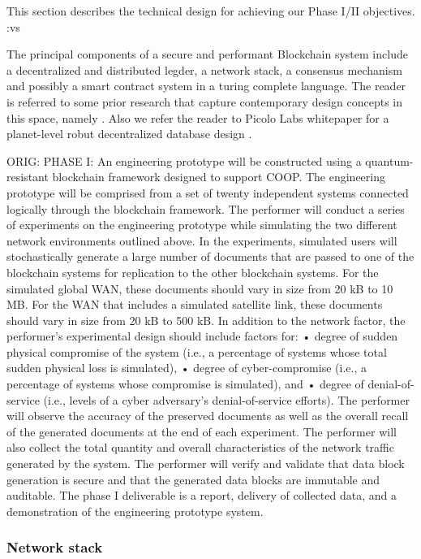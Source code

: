 This section describes the technical design for achieving our Phase I/II objectives. :vs

The principal components of a secure and performant Blockchain system include a decentralized and distributed legder, a
network stack, a consensus mechanism and possibly a smart contract system in a turing complete language. The reader is
referred to some prior research that capture contemporary design concepts in this space, namely \cite{micali16,
garay2015, ava2018}. Also we refer the reader to Picolo Labs whitepaper for a planet-level robut decentralized database
design \cite{picolo}.

ORIG:
PHASE I: An engineering prototype will be constructed using a quantum-resistant blockchain framework designed to support
COOP. The engineering prototype will be comprised from a set of twenty independent systems connected logically through
the blockchain framework. The performer will conduct a series of experiments on the engineering prototype while
simulating the two different network environments outlined above. In the experiments, simulated users will
stochastically generate a large number of documents that are passed to one of the blockchain systems for replication to
the other blockchain systems. For the simulated global WAN, these documents should vary in size from 20 kB to 10 MB. For
the WAN that includes a simulated satellite link, these documents should vary in size from 20 kB to 500 kB. In addition
to the network factor, the performer’s experimental design should include factors for: • degree of sudden physical
compromise of the system (i.e., a percentage of systems whose total sudden physical loss is simulated), • degree of
cyber-compromise (i.e., a percentage of systems whose compromise is simulated), and • degree of denial-of-service (i.e.,
levels of a cyber adversary’s denial-of-service efforts). The performer will observe the accuracy of the preserved
documents as well as the overall recall of the generated documents at the end of each experiment. The performer will
also collect the total quantity and overall characteristics of the network traffic generated by the system. The
performer will verify and validate that data block generation is secure and that the generated data blocks are immutable
and auditable. The phase I deliverable is a report, delivery of collected data, and a demonstration of the engineering
prototype system.

\subsubsection{Network stack}

